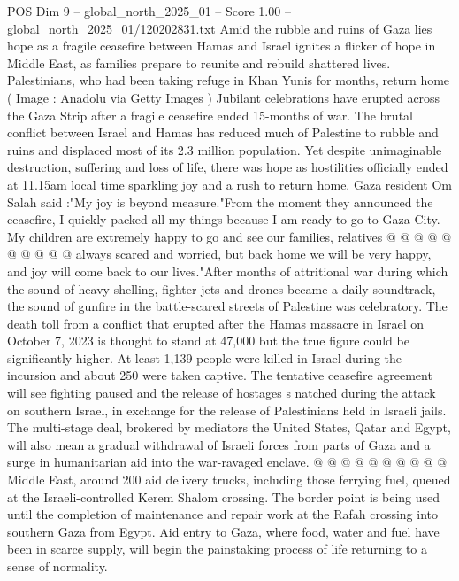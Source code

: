 \begin{textsample}{POS Dim 9 – global\_north\_2025\_01 – Score 1.00 – global\_north\_2025\_01/120202831.txt}  \label{ex:f9_pos_356}
Amid the rubble and ruins of Gaza lies hope as a fragile ceasefire between Hamas and Israel ignites a flicker of hope in Middle East, as families prepare to reunite and rebuild shattered lives.
Palestinians, who had been taking refuge in Khan Yunis for months, return home ( Image : Anadolu via Getty Images ) Jubilant celebrations have erupted across the Gaza Strip after a fragile ceasefire ended 15-months of war.
The brutal conflict between Israel and Hamas has reduced much of Palestine to rubble and ruins and displaced most of its 2.3 million population.
Yet despite unimaginable destruction, suffering and loss of life, there was hope as hostilities officially ended at 11.15am local time sparkling joy and a rush to return home.
Gaza resident Om Salah said :"My joy is beyond measure."From the moment they announced the ceasefire, I quickly packed all my things because I am ready to go to Gaza City.
My children are extremely happy to go and see our families, relatives @ @ @ @ @ @ @ @ @ @ always scared and worried, but back home we will be very happy, and joy will come back to our lives."After months of attritional war during which the sound of heavy shelling, fighter jets and drones became a daily soundtrack, the sound of gunfire in the battle-scared streets of Palestine was celebratory.
The death toll from a conflict that erupted after the Hamas massacre in Israel on October 7, 2023 is thought to stand at 47,000 but the true figure could be significantly higher.
At least 1,139 people were killed in Israel during the incursion and about 250 were taken captive.
The tentative ceasefire agreement will see fighting paused and the release of hostages s natched during the attack on southern Israel, in exchange for the release of Palestinians held in Israeli jails.
The multi-stage deal, brokered by mediators the United States, Qatar and Egypt, will also mean a gradual withdrawal of Israeli forces from parts of Gaza and a surge in humanitarian aid into the war-ravaged enclave. @ @ @ @ @ @ @ @ @ @ Middle East, around 200 aid delivery trucks, including those ferrying fuel, queued at the Israeli-controlled Kerem Shalom crossing.
The border point is being used until the completion of maintenance and repair work at the Rafah crossing into southern Gaza from Egypt.
Aid entry to Gaza, where food, water and fuel have been in scarce supply, will begin the painstaking process of life returning to a sense of normality.

\end{textsample}
